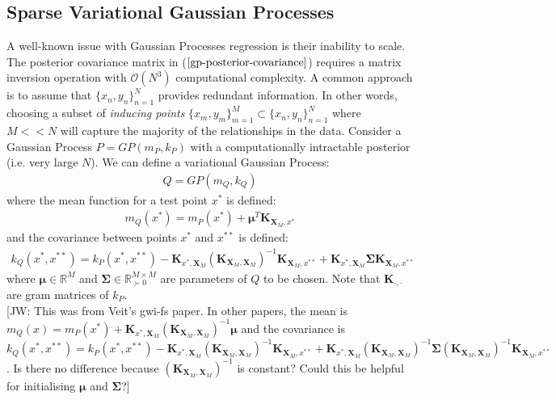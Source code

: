 \documentclass[twoside,11pt]{article}
\newcommand{\jw}[1]{{\color{gray} [JW: #1]}}
\begin{document}
\subsection{Sparse Variational Gaussian Processes \cite{wild2023connections}}
A well-known issue with Gaussian Processes regression is their inability to scale. The posterior covariance matrix in ($\ref{gp-posterior-covariance}$) requires a matrix inversion operation with $\mathcal{O}(N^3)$ computational complexity. A common approach is to assume that $\{x_n, y_n\}_{n=1}^{N}$ provides redundant information. In other words, choosing a subset of \textit{inducing points} $\{x_m, y_m\}_{m=1}^{M} \subset \{x_n, y_n\}_{n=1}^{N}$ where $M << N$ will capture the majority of the relationships in the data. Consider a Gaussian Process $P = GP(m_P, k_P)$ with a computationally intractable posterior (i.e. very large $N$). We can define a variational Gaussian Process:
\begin{align}
    Q = GP(m_Q, k_Q)
    \label{svgp}
\end{align}
where the mean function for a test point $x^*$ is defined:
\begin{align}
    m_Q(x^*) = m_P(x^*) + \mathbf{\mu}^T\mathbf{K}_{\mathbf{X}_M, x^*}
    \label{svgp-mean}
\end{align}
and the covariance between points $x^*$ and $x^{**}$ is defined:
\begin{align}
        k_Q(x^*, x^{**}) = k_P(x^*, x^{**}) - \mathbf{K}_{x^*, \mathbf{X}_M} \left(\mathbf{K}_{\mathbf{X}_M, \mathbf{X}_M}\right)^{-1}\mathbf{K}_{\mathbf{X}_M, x^{**}} + \mathbf{K}_{x^*, \mathbf{X}_M} \mathbf{\Sigma}\mathbf{K}_{\mathbf{X}_M, x^{**}}
    \label{svgp-covariance}
\end{align}
where $\mathbf{\mu} \in \mathbb{R}^{M}$ and $\mathbf{\Sigma} \in \mathbb{R}^{M\times M}_{\succ 0}$ are parameters of $Q$ to be chosen. Note that $\mathbf{K}_{\cdot, \cdot}$ are gram matrices of $k_P$.
\\\jw{This was from Veit's gwi-fs paper. In other papers, the mean is $m_Q(x) =  m_P(x^*) + \mathbf{K}_{x^*, \mathbf{X}_M} \left(\mathbf{K}_{\mathbf{X}_M, \mathbf{X}_M}\right)^{-1} \mathbf{\mu}$ and the covariance is $k_Q(x^*, x^{**}) = k_P(x^*, x^{**}) - \mathbf{K}_{x^*, \mathbf{X}_M} \left(\mathbf{K}_{\mathbf{X}_M, \mathbf{X}_M}\right)^{-1}\mathbf{K}_{\mathbf{X}_M, x^{**}} + \mathbf{K}_{x^*, \mathbf{X}_M} \left(\mathbf{K}_{\mathbf{X}_M, \mathbf{X}_M}\right)^{-1} \mathbf{\Sigma}\left(\mathbf{K}_{\mathbf{X}_M, \mathbf{X}_M}\right)^{-1}\mathbf{K}_{\mathbf{X}_M, x^{**}}$. Is there no difference because $\left(\mathbf{K}_{\mathbf{X}_M, \mathbf{X}_M}\right)^{-1}$ is constant? Could this be helpful for initialising $\mathbf{\mu}$ and $\mathbf{\Sigma}$?}
\end{document}
